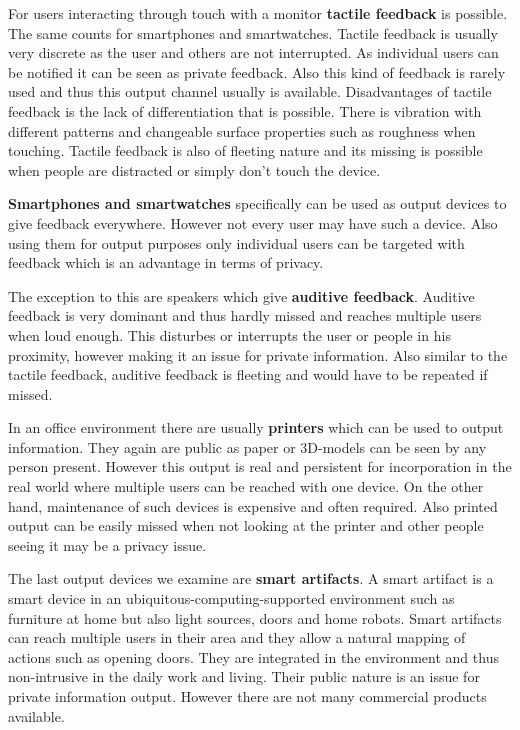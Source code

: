 For users interacting through touch with a monitor \textbf{tactile feedback} is possible.
The same counts for smartphones and smartwatches.
Tactile feedback is usually very discrete as the user and others are not interrupted.
As individual users can be notified it can be seen as private feedback.
Also this kind of feedback is rarely used and thus this output channel usually is available.
Disadvantages of tactile feedback is the lack of differentiation that is possible.
There is vibration with different patterns and changeable surface properties such as roughness when touching.
Tactile feedback is also of fleeting nature and its missing is possible when people are distracted or simply don’t touch the device.

\textbf{Smartphones and smartwatches} specifically can be used as output devices to give feedback everywhere.
However not every user may have such a device.
Also using them for output purposes only individual users can be targeted with feedback which is an advantage in terms of privacy.

The exception to this are speakers which give \textbf{auditive feedback}.
Auditive feedback is very dominant and thus hardly missed and reaches multiple users when loud enough.
This disturbes or interrupts the user or people in his proximity, however making it an issue for private information.
Also similar to the tactile feedback, auditive feedback is fleeting and would have to be repeated if missed.

In an office environment there are usually \textbf{printers} which can be used to output information.
They again are public as paper or 3D-models can be seen by any person present.
However this output is real and persistent for incorporation in the real world where multiple users can be reached with one device.
On the other hand, maintenance of such devices is expensive and often required.
Also printed output can be easily missed when not looking at the printer and other people seeing it may be a privacy issue.

The last output devices we examine are \textbf{smart artifacts}.
A smart artifact is a smart device in an ubiquitous-computing-supported environment such as furniture at home but also light sources, doors and home robots.
Smart artifacts can reach multiple users in their area and they allow a natural mapping of actions such as opening doors.
They are integrated in the environment and thus non-intrusive in the daily work and living.
Their public nature is an issue for private information output.
However there are not many commercial products available.
